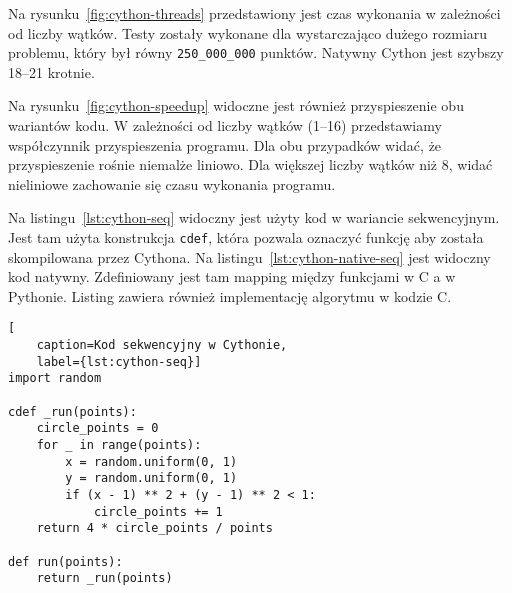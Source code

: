 \begin{figure*}
    \centering
    \begin{minipage}[b]{.45\textwidth}
        \centering
        
        \caption{Czas wykonania algorytmu w Cythonie w zależności od liczby wątków}
        \label{fig:cython-threads}
    \end{minipage}
    \hfill
    \begin{minipage}[b]{.45\textwidth}
        \centering
        
        \caption{Przyspieszenie liczenia liczby $\pi$ w Cythonie}
        \label{fig:cython-speedup}
    \end{minipage}
\end{figure*}

Na rysunku~\ref{fig:cython-threads} przedstawiony jest czas wykonania
w zależności od liczby wątków.
Testy zostały wykonane dla wystarczająco dużego rozmiaru problemu,
który był równy \texttt{250\_000\_000} punktów.
Natywny Cython jest szybszy 18--21 krotnie.

Na rysunku~\ref{fig:cython-speedup} widoczne jest również przyspieszenie
obu wariantów kodu.
W zależności od liczby wątków (1--16) przedstawiamy współczynnik
przyspieszenia programu.
Dla obu przypadków widać, że przyspieszenie rośnie niemalże liniowo.
Dla większej liczby wątków niż 8, widać nieliniowe zachowanie się czasu
wykonania programu.

Na listingu~\ref{lst:cython-seq} widoczny jest użyty kod w wariancie
sekwencyjnym.
Jest tam użyta konstrukcja \texttt{cdef}, która pozwala
oznaczyć funkcję aby została skompilowana przez Cythona.
Na listingu~\ref{lst:cython-native-seq} jest widoczny kod
natywny.
Zdefiniowany jest tam mapping między funkcjami w C a w Pythonie.
Listing zawiera również implementację algorytmu w kodzie C\@.

\noindent\begin{minipage}{\columnwidth}
\begin{lstlisting}[
    caption=Kod sekwencyjny w Cythonie,
    label={lst:cython-seq}]
import random

cdef _run(points):
    circle_points = 0
    for _ in range(points):
        x = random.uniform(0, 1)
        y = random.uniform(0, 1)
        if (x - 1) ** 2 + (y - 1) ** 2 < 1:
            circle_points += 1
    return 4 * circle_points / points

def run(points):
    return _run(points)
\end{lstlisting}
\end{minipage}

